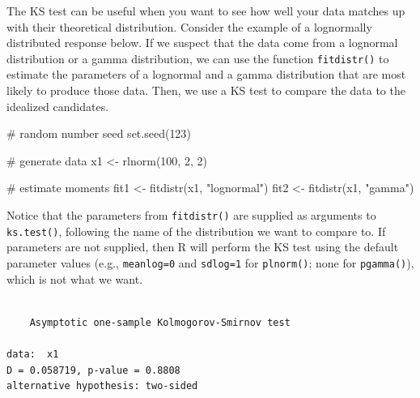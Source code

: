 \documentclass[
  13,
  letterpaper,
]{report}
\newenvironment{Shaded}{\begin{snugshade}}{\end{snugshade}}
\newcommand{\CommentTok}[1]{\textcolor[rgb]{0.37,0.37,0.37}{#1}}
\newcommand{\DecValTok}[1]{\textcolor[rgb]{0.68,0.00,0.00}{#1}}
\newcommand{\FunctionTok}[1]{\textcolor[rgb]{0.28,0.35,0.67}{#1}}
\newcommand{\NormalTok}[1]{\textcolor[rgb]{0.00,0.23,0.31}{#1}}
\newcommand{\OtherTok}[1]{\textcolor[rgb]{0.00,0.23,0.31}{#1}}
\newcommand{\SpecialCharTok}[1]{\textcolor[rgb]{0.37,0.37,0.37}{#1}}
\newcommand{\StringTok}[1]{\textcolor[rgb]{0.13,0.47,0.30}{#1}}
\begin{document}
The KS test can be useful when you want to see how well your data
matches up with their theoretical distribution. Consider the example of
a lognormally distributed response below. If we suspect that the data
come from a lognormal distribution or a gamma distribution, we can use
the function \texttt{fitdistr()} to estimate the parameters of a
lognormal and a gamma distribution that are most likely to produce those
data. Then, we use a KS test to compare the data to the idealized
candidates.

\begin{Shaded}
\begin{Highlighting}[]
\CommentTok{\# random number seed}
\FunctionTok{set.seed}\NormalTok{(}\DecValTok{123}\NormalTok{)}

\CommentTok{\# generate data}
\NormalTok{x1 }\OtherTok{\textless{}{-}} \FunctionTok{rlnorm}\NormalTok{(}\DecValTok{100}\NormalTok{, }\DecValTok{2}\NormalTok{, }\DecValTok{2}\NormalTok{)}

\CommentTok{\# estimate moments}
\NormalTok{fit1 }\OtherTok{\textless{}{-}} \FunctionTok{fitdistr}\NormalTok{(x1, }\StringTok{"lognormal"}\NormalTok{)}
\NormalTok{fit2 }\OtherTok{\textless{}{-}} \FunctionTok{fitdistr}\NormalTok{(x1, }\StringTok{"gamma"}\NormalTok{)}
\end{Highlighting}
\end{Shaded}

Notice that the parameters from \texttt{fitdistr()} are supplied as
arguments to \texttt{ks.test()}, following the name of the distribution
we want to compare to. If parameters are not supplied, then R will
perform the KS test using the default parameter values (e.g.,
\texttt{meanlog=0} and \texttt{sdlog=1} for \texttt{plnorm()}; none for
\texttt{pgamma()}), which is not what we want.

\begin{Shaded}
\end{Shaded}

\begin{verbatim}

    Asymptotic one-sample Kolmogorov-Smirnov test

data:  x1
D = 0.058719, p-value = 0.8808
alternative hypothesis: two-sided
\end{verbatim}
\end{document}
